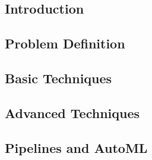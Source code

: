 

\subsection{Introduction}


\subsection{Problem Definition}


\subsection{Basic Techniques}


\subsection{Advanced Techniques}


\subsection{Pipelines and AutoML}


%
